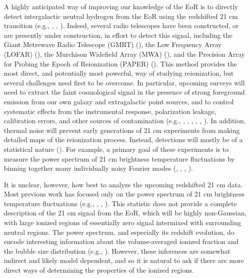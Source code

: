 A highly anticipated way of improving our knowledge of the EoR is to directly detect intergalactic neutral hydrogen
from the EoR using the redshifted 21 cm transition (e.g., \citealt{Madau:1996cs}, \citealt{Zaldarriaga:2003du}, \citealt{Furlanetto:2006jb}). Indeed, several radio telescopes have been constructed, or are presently under construction, in effort to detect this signal, including the Giant Metrewave Radio Telescope (GMRT) (\citealt{Paciga:2010yy}), the Low Frequency Array (LOFAR) (\citealt{Harker:2010ht}), the Murchison Widefield Array (MWA) (\citealt{Lonsdale:2009cb}), and the Precision Array for Probing the Epoch of Reionization (PAPER) 
(\citealt{Parsons:2009in}). This method provides the most direct, and potentially most
powerful, way of studying reionization, but several challenges need first to be overcome.
In particular, upcoming surveys will need to extract the faint cosmological signal in the presence of strong
foreground emission from our own galaxy and extragalactic
point sources, and to control systematic effects from the instrumental response, polarization leakage, calibration errors,
and other sources of contamination (e.g., \citealt{Liu:2009qga}, \citealt{Datta:2010pk}, \citealt{Harker:2010ht}, \citealt{Petrovic:2010me}, \citealt{Morales:2012kf}, \citealt{Parsons:2012qh}). In addition, thermal noise will prevent early generations of 21 cm experiments from making detailed maps
of the reionization process. Instead, detections will mostly be of a statistical
nature (\citealt{McQuinn:2005hk}). For example, a primary goal of these 
experiments is to measure the power spectrum of 21 cm brightness
temperature fluctuations by binning together many individually noisy Fourier 
modes (\citealt{Zaldarriaga:2003du}, \citealt{Morales:2003vn}, \citealt{Bowman:2005cr},
\citealt{McQuinn:2005hk}). 

It is unclear, however, how best to analyze the upcoming redshifted 21 cm data. Most previous work
has focused only on the power spectrum of 21 cm brightness temperature fluctuations (e.g., \citealt{Furlanetto:2004ha}, \citealt{Lidz:2007az}, \citealt{Mesinger:2010ne}). This statistic does not provide a complete
description of the 21 cm signal from the EoR, which will be highly non-Gaussian, with large ionized regions of essentially zero signal
intermixed with surrounding neutral regions. The power spectrum, and especially its redshift evolution, do encode interesting information
about the volume-averaged ionized fraction and the bubble size distribution (e.g., \citealt{Lidz:2007az}). However, these inferences are somewhat indirect and likely model dependent,
and so it is natural to ask if there are more direct ways of determining the properties of the ionized regions.

